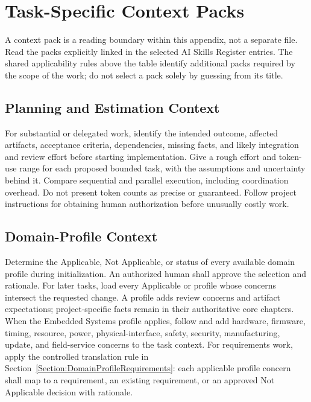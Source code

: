 \section{Task-Specific Context Packs}
A context pack is a reading boundary within this appendix, not a separate file.
Read the packs explicitly linked in the selected AI Skills Register entries. The
shared applicability rules above the table identify additional packs required
by the scope of the work; do not select a pack solely by guessing from its title.

\subsection{Planning and Estimation Context}
\label{Section:AIPlanningEstimateContext}
For substantial or delegated work, identify the intended outcome, affected
artifacts, acceptance criteria, dependencies, missing facts, and likely
integration and review effort before starting implementation. Give a rough
effort and token-use range for each proposed bounded task, with the assumptions
and uncertainty behind it. Compare sequential and parallel execution,
including coordination overhead. Do not present token counts as precise or
guaranteed. Follow project instructions for obtaining human authorization
before unusually costly work.

\subsection{Domain-Profile Context}
\label{Section:AIDomainContext}
Determine the Applicable, Not Applicable, or \OwnedTBD{} status of every available
domain profile during initialization. An authorized human shall approve the
selection and rationale. For later tasks, load every Applicable or \OwnedTBD{} profile
whose concerns intersect the requested change. A profile adds review concerns
and artifact expectations; project-specific facts remain in their authoritative
core chapters. When the Embedded Systems profile applies, follow
 and add hardware, firmware, timing,
resource, power, physical-interface, safety, security, manufacturing, update,
and field-service concerns to the task context. For requirements work, apply
the controlled translation rule in
Section~\ref{Section:DomainProfileRequirements}: each applicable profile
concern shall map to a requirement, an existing requirement, or an approved
Not Applicable decision with rationale.


